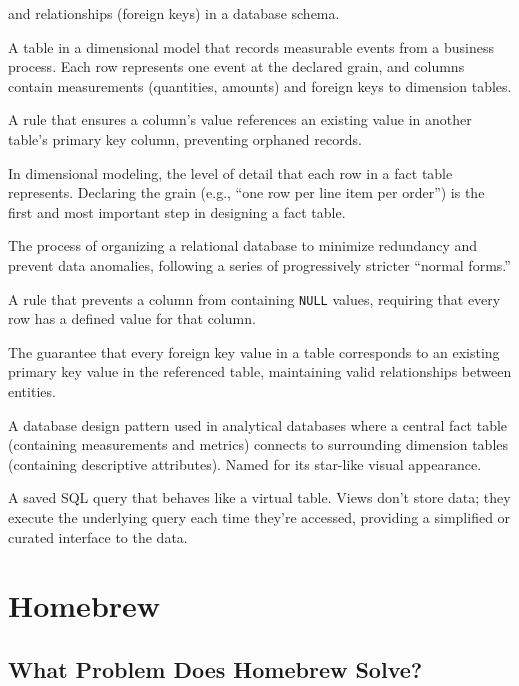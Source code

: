 \documentclass[
  letterpaper,
  DIV=11,
  numbers=noendperiod]{scrreprt}
\begin{document}
\begin{description}
and relationships (foreign keys) in a database schema.
\item[\textbf{Fact Table}]
A table in a dimensional model that records measurable events from a
business process. Each row represents one event at the declared grain,
and columns contain measurements (quantities, amounts) and foreign keys
to dimension tables.
\item[\textbf{Foreign Key Constraint}]
A rule that ensures a column's value references an existing value in
another table's primary key column, preventing orphaned records.
\item[\textbf{Grain}]
In dimensional modeling, the level of detail that each row in a fact
table represents. Declaring the grain (e.g., ``one row per line item per
order'') is the first and most important step in designing a fact table.
\item[\textbf{Normalization}]
The process of organizing a relational database to minimize redundancy
and prevent data anomalies, following a series of progressively stricter
``normal forms.''
\item[\textbf{NOT NULL Constraint}]
A rule that prevents a column from containing \texttt{NULL} values,
requiring that every row has a defined value for that column.
\item[\textbf{Referential Integrity}]
The guarantee that every foreign key value in a table corresponds to an
existing primary key value in the referenced table, maintaining valid
relationships between entities.
\item[\textbf{Star Schema}]
A database design pattern used in analytical databases where a central
fact table (containing measurements and metrics) connects to surrounding
dimension tables (containing descriptive attributes). Named for its
star-like visual appearance.
\item[\textbf{View}]
A saved SQL query that behaves like a virtual table. Views don't store
data; they execute the underlying query each time they're accessed,
providing a simplified or curated interface to the data.
\end{description}

\cleardoublepage
{}
{}
\appendix

\chapter{Homebrew}\label{homebrew}

\section{What Problem Does Homebrew
Solve?}\label{what-problem-does-homebrew-solve}
\end{document}

